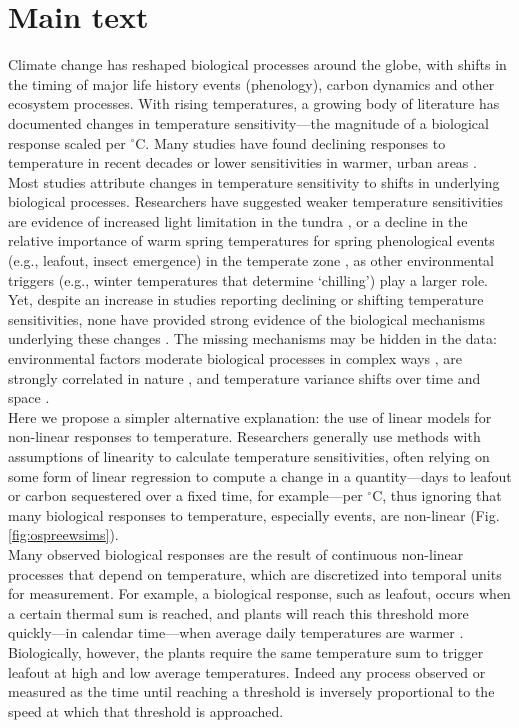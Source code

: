 \documentclass[11pt,letter]{article}
\begin{document}
\newpage
\section{Main text} %
Climate change has reshaped biological processes around the globe, with shifts in the timing of major life history events (phenology), carbon dynamics and other ecosystem processes. With rising temperatures,  a growing body of literature has documented changes in temperature sensitivity---the magnitude of a biological response scaled per $^{\circ}$C. Many studies have found declining responses to temperature in recent decades \citep{fu2015,piao2017} or lower sensitivities in warmer, urban areas \citep{meng2020}.\\

Most studies attribute changes in temperature sensitivity to shifts in underlying biological processes. Researchers have suggested weaker temperature sensitivities are evidence of increased light limitation in the tundra \citep{piao2017}, or a decline in the relative importance of warm spring temperatures for spring phenological events (e.g., leafout, insect emergence) in the temperate zone \citep{fu2015,meng2020}, as other environmental triggers (e.g., winter temperatures that determine `chilling') play a larger role. Yet, despite an increase in studies reporting declining or shifting temperature sensitivities, none have provided strong evidence of the biological mechanisms underlying these changes  \citep[e.g.,][]{fu2015,meng2020}. The missing mechanisms may be hidden in the data: environmental factors moderate biological processes in complex ways \citep{chuine2016}, are strongly correlated in nature \citep[e.g.,][]{fu2015}, and temperature variance shifts over time and space \citep{keenan2019}. \\


Here we propose a simpler alternative explanation: the use of linear models for non-linear responses to temperature. Researchers generally use methods with assumptions of linearity to calculate temperature sensitivities, often relying on some form of linear regression to compute a change in a quantity---days to leafout or carbon sequestered over a fixed time, for example---per $^{\circ}$C, thus ignoring that many biological responses to temperature, especially events, are non-linear (Fig. \ref{fig:ospreewsims}). \\ 

Many observed biological responses are the result of continuous non-linear processes that depend on temperature, which are discretized into temporal units for measurement. For example, a biological response, such as leafout, occurs when a certain thermal sum is reached, and plants will reach this threshold more quickly---in calendar time---when average daily temperatures are warmer \citep[Fig. \ref{fig:ospreewsims},][]{kramer2012book}. 
Biologically, however, the plants require the same temperature sum to trigger leafout at high and low average temperatures. Indeed any process observed or measured as the time until reaching a threshold is inversely proportional to the speed at which that threshold is approached. \\ 
\end{document}
